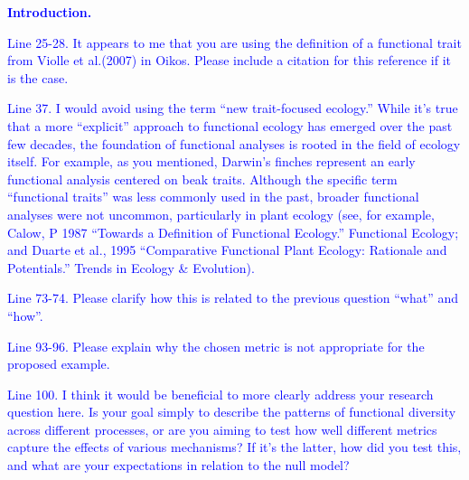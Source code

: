 \documentclass[
]{article}
\begin{document}
\textcolor{blue}{\textbf{Introduction.}}

\textcolor{blue}{Line 25-28. It appears to me that you are using the definition of a functional trait from Violle et al.(2007) in Oikos. Please include a citation for this reference if it is the case.}

\textcolor{blue}{Line 37. I would avoid using the term ``new trait-focused ecology.'' While it's true that a more ``explicit'' approach to functional ecology has emerged over the past few decades, the foundation of functional analyses is rooted in the field of ecology itself.
For example, as you mentioned, Darwin's finches represent an early functional analysis centered on beak traits.
Although the specific term ``functional traits'' was less commonly used in the past, broader functional analyses were not uncommon, particularly in plant ecology (see, for example, Calow, P 1987 ``Towards a Definition of Functional Ecology.'' Functional Ecology; and Duarte et al., 1995 ``Comparative Functional Plant Ecology: Rationale and Potentials.'' Trends in Ecology \& Evolution).}

\textcolor{blue}{Line 73-74. Please clarify how this is related to the previous question ``what'' and ``how''.}

\textcolor{blue}{Line 93-96. Please explain why the chosen metric is not appropriate for the proposed example.}

\textcolor{blue}{Line 100. I think it would be beneficial to more clearly address your research question here. Is your goal simply to describe the patterns of functional diversity across different processes, or are you aiming to test how well different metrics capture the effects of various mechanisms? If it's the latter, how did you test this, and what are your expectations in relation to the null model?}
\end{document}
